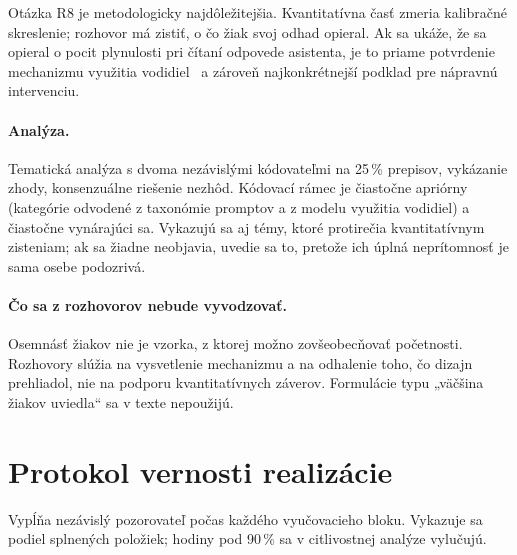 Otázka R8 je metodologicky najdôležitejšia. Kvantitatívna časť zmeria kalibračné skreslenie; rozhovor má zistiť, o čo žiak svoj odhad opieral. Ak sa ukáže, že sa opieral o pocit plynulosti pri čítaní odpovede asistenta, je to priame potvrdenie mechanizmu využitia vodidiel~\cite{koriat1997monitoring} a zároveň najkonkrétnejší podklad pre nápravnú intervenciu.

\paragraph{Analýza.} Tematická analýza s dvoma nezávislými kódovateľmi na 25\,\% prepisov, vykázanie zhody, konsenzuálne riešenie nezhôd. Kódovací rámec je čiastočne apriórny (kategórie odvodené z taxonómie promptov a z modelu využitia vodidiel) a čiastočne vynárajúci sa. Vykazujú sa aj témy, ktoré protirečia kvantitatívnym zisteniam; ak sa žiadne neobjavia, uvedie sa to, pretože ich úplná neprítomnosť je sama osebe podozrivá.

\paragraph{Čo sa z rozhovorov nebude vyvodzovať.} Osemnásť žiakov nie je vzorka, z ktorej možno zovšeobecňovať početnosti. Rozhovory slúžia na vysvetlenie mechanizmu a na odhalenie toho, čo dizajn prehliadol, nie na podporu kvantitatívnych záverov. Formulácie typu „väčšina žiakov uviedla“ sa v texte nepoužijú.

\section{Protokol vernosti realizácie}
\label{sec:vernost}

Vypĺňa nezávislý pozorovateľ počas každého vyučovacieho bloku. Vykazuje sa podiel splnených položiek; hodiny pod 90\,\% sa v citlivostnej analýze vylučujú.

